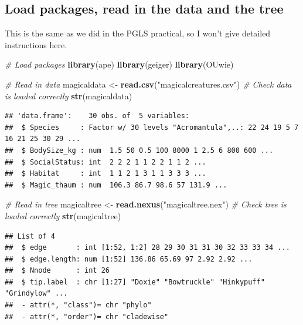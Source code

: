\documentclass[]{book}
\newenvironment{Shaded}{\begin{snugshade}}{\end{snugshade}}
\newcommand{\KeywordTok}[1]{\textcolor[rgb]{0.13,0.29,0.53}{\textbf{{#1}}}}
\newcommand{\StringTok}[1]{\textcolor[rgb]{0.31,0.60,0.02}{{#1}}}
\newcommand{\CommentTok}[1]{\textcolor[rgb]{0.56,0.35,0.01}{\textit{{#1}}}}
\newcommand{\NormalTok}[1]{{#1}}
\theoremstyle{definition}
\theoremstyle{definition}
\theoremstyle{definition}
\theoremstyle{remark}
\begin{document}
\subsection{Load packages, read in the data and the
tree}\label{load-packages-read-in-the-data-and-the-tree-1}

This is the same as we did in the PGLS practical, so I won't give
detailed instructions here.

\begin{Shaded}
\begin{Highlighting}[]
\CommentTok{# Load packages}
\KeywordTok{library}\NormalTok{(ape)}
\KeywordTok{library}\NormalTok{(geiger)}
\KeywordTok{library}\NormalTok{(OUwie)}
\end{Highlighting}
\end{Shaded}

\begin{Shaded}
\begin{Highlighting}[]
\CommentTok{# Read in data}
\NormalTok{magicaldata <-}\StringTok{ }\KeywordTok{read.csv}\NormalTok{(}\StringTok{"magicalcreatures.csv"}\NormalTok{)}
\CommentTok{# Check data is loaded correctly}
\KeywordTok{str}\NormalTok{(magicaldata)}
\end{Highlighting}
\end{Shaded}

\begin{verbatim}
## 'data.frame':    30 obs. of  5 variables:
##  $ Species     : Factor w/ 30 levels "Acromantula",..: 22 24 19 5 7 16 21 25 30 29 ...
##  $ BodySize_kg : num  1.5 50 0.5 100 8000 1 2.5 6 800 600 ...
##  $ SocialStatus: int  2 2 2 1 1 2 2 1 1 2 ...
##  $ Habitat     : int  1 1 2 1 3 1 1 3 3 3 ...
##  $ Magic_thaum : num  106.3 86.7 98.6 57 131.9 ...
\end{verbatim}

\begin{Shaded}
\begin{Highlighting}[]
\CommentTok{# Read in tree}
\NormalTok{magicaltree <-}\StringTok{ }\KeywordTok{read.nexus}\NormalTok{(}\StringTok{"magicaltree.nex"}\NormalTok{) }
\CommentTok{# Check tree is loaded correctly}
\KeywordTok{str}\NormalTok{(magicaltree)}
\end{Highlighting}
\end{Shaded}

\begin{verbatim}
## List of 4
##  $ edge       : int [1:52, 1:2] 28 29 30 31 31 30 32 33 33 34 ...
##  $ edge.length: num [1:52] 136.86 65.69 97 2.92 2.92 ...
##  $ Nnode      : int 26
##  $ tip.label  : chr [1:27] "Doxie" "Bowtruckle" "Hinkypuff" "Grindylow" ...
##  - attr(*, "class")= chr "phylo"
##  - attr(*, "order")= chr "cladewise"
\end{verbatim}
\end{document}
